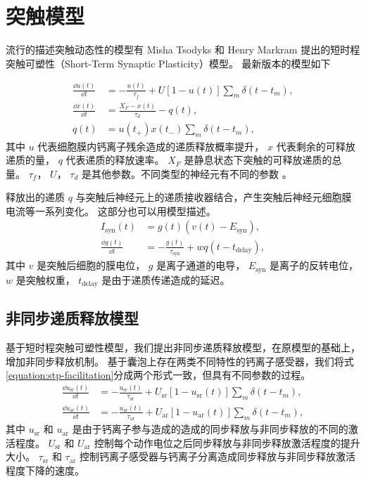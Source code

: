 \section{突触模型}
\label{section:model:synapse-model}
流行的描述突触动态性的模型有 Misha Tsodyks 和 Henry Markram 提出的短时程突触可塑性（Short-Term Synaptic Plasticity）模型\cite{Markram1996,Tsodyks1997}。
最新版本的模型如下\cite{Tsodyks2013}

\begin{align}
\frac{\dd{u\left(t\right)}}{\dd{t}} &=  -\frac{u\left(t\right)}{\tau_f}+U\left[1-u\left(t\right)\right]\sum_m \delta\left(t-t_m\right), \label{equation:stp-facilitation} \\
\frac{\dd{x\left(t\right)}}{\dd{t}} &=
\frac{X_F-x\left(t\right)}{\tau_d} - q(t),
\label{equation:stp-depression} \\
q(t) & = u\left(t_+\right)x\left(t_-\right) \sum_m \delta\left(t-t_m\right),
\label{equation:stp-release}
\end{align}
其中 $u$ 代表细胞膜内钙离子残余造成的递质释放概率提升， $x$ 代表剩余的可释放递质的量， $q$ 代表递质的释放速率。 
$X_F$ 是静息状态下突触的可释放递质的总量。 
$\tau_f$， $U$， $\tau_d$ 是其他参数。不同类型的神经元有不同的参数 \cite{Silberberg2005}。

释放出的递质 $q$ 与突触后神经元上的递质接收器结合，产生突触后神经元细胞膜电流等一系列变化。
这部分也可以用模型描述\cite{Destexhe1994}。
\begin{align}
I_\text{syn}(t) &= g(t)\left(v(t) - E_\text{syn}\right), \label{equation:synaptic-current-general} \\
\frac{\dd{g(t)}}{\dd{t}} &= -\frac{g(t)}{\tau_\text{syn}} + wq(t - t_\text{delay}), \label{equation:receptor-conductance-general}
\end{align}
其中 $v$ 是突触后细胞的膜电位， $g$ 是离子通道的电导， $E_\text{syn}$ 是离子的反转电位， $w$ 是突触权重， $t_\text{delay}$ 是由于递质传递造成的延迟。

\subsection{非同步递质释放模型}
\label{section:model:asynchronous-release}
基于短时程突触可塑性模型，我们提出非同步递质释放模型，在原模型的基础上，增加非同步释放机制。
基于囊泡上存在两类不同特性的钙离子感受器，我们将式\ref{equation:stp-facilitation}分成两个形式一致，但具有不同参数的过程。
\begin{align}
\frac{\dd{u_\text{sr}\left(t\right)}}{\dd{t}} &= -\frac{u_\text{sr}\left(t\right)}{\tau_\text{sr}}+U_\text{sr}\left[1-u_\text{sr}\left(t\right)\right]\sum_m \delta\left(t-t_m\right), \label{equation:sr-facilitation} \\
\frac{\dd{u_\text{ar}\left(t\right)}}{\dd{t}} &= -\frac{u_\text{ar}\left(t\right)}{\tau_\text{ar}}+U_\text{ar}\left[1-u_\text{ar}\left(t\right)\right]\sum_m \delta\left(t-t_m\right), \label{equation:ar-facilitation}
\end{align}
其中 $u_\text{sr}$ 和 $u_\text{ar}$ 是由于钙离子参与造成的造成的同步释放与非同步释放的不同的激活程度。
$U_\text{sr}$ 和 $U_\text{ar}$ 控制每个动作电位之后同步释放与非同步释放激活程度的提升大小。
$\tau_\text{sr}$ 和 $\tau_\text{ar}$ 控制钙离子感受器与钙离子分离造成同步释放与非同步释放激活程度下降的速度。

